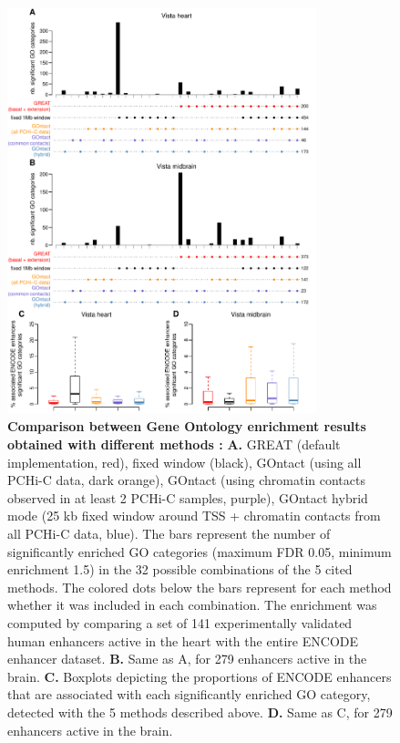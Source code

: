 \begin{figure}[hbt!]
    \centering
    \includegraphics[width=0.8\textwidth, page=1] {figures/GOntact/Figure4.pdf}
    \caption[Comparison between Gene Ontology enrichment results obtained with different methods]{
    \textbf{Comparison between Gene Ontology enrichment results obtained with different methods :}
    \textbf{A.} GREAT (default implementation, red), fixed window (black), GOntact (using all PCHi-C data, dark orange), GOntact (using chromatin contacts observed in at least 2 PCHi-C samples, purple), GOntact hybrid mode (25 kb fixed window around TSS + chromatin contacts from all PCHi-C data, blue). The bars represent the number of significantly enriched GO categories (maximum FDR 0.05, minimum enrichment 1.5) in the 32 possible combinations of the 5 cited methods. The colored dots below the bars represent for each method whether it was included in each combination. The enrichment was computed by comparing a set of 141 experimentally validated human enhancers active in the heart with the entire ENCODE enhancer dataset. 
    \textbf{B.}  Same as A, for 279 enhancers active in the brain. 
    \textbf{C.} Boxplots depicting the proportions of ENCODE enhancers that are associated with each significantly enriched GO category, detected with the 5 methods described above. 
    \textbf{D.} Same as C,  for 279 enhancers active in the brain. 
    \\
    }
    \label{fig:GOntact-fig4}
\end{figure} 

